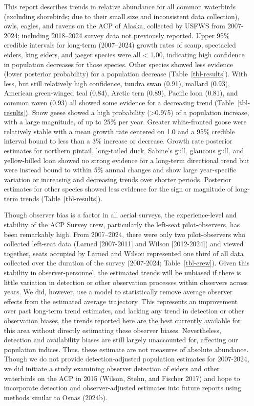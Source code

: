 \documentclass[
]{article}
\begin{document}
This report describes trends in relative abundance for all common
waterbirds (excluding shorebirds; due to their small size and
inconsistent data collection), owls, eagles, and ravens on the ACP of
Alaska, collected by USFWS from 2007-2024; including 2018--2024 survey
data not previously reported. Upper 95\% credible intervals for
long-term (2007--2024) growth rates of scaup, spectacled eiders, king
eiders, and jaeger species were all \textless{} 1.00, indicating high
confidence in population decreases for those species. Other species
showed less evidence (lower posterior probability) for a population
decrease (Table~\ref{tbl-results}). With less, but still relatively high
confidence, tundra swan (0.91), mallard (0.93), American green-winged
teal (0.84), Arctic tern (0.89), Pacific loon (0.81), and common raven
(0.93) all showed some evidence for a decreasing trend
(Table~\ref{tbl-results}). Snow geese showed a high probability
(\textgreater0.975) of a population increase, with a large magnitude, of
up to 25\% per year. Greater white-fronted goose were relatively stable
with a mean growth rate centered on 1.0 and a 95\% credible interval
bound to less than a 3\% increase or decrease. Growth rate posterior
estimates for northern pintail, long-tailed duck, Sabine's gull,
glaucous gull, and yellow-billed loon showed no strong evidence for a
long-term directional trend but were instead bound to within 5\% annual
changes and show large year-specific variation or increasing and
decreasing trends over shorter periods. Posterior estimates for other
species showed less evidence for the sign or magnitude of long-term
trends (Table~\ref{tbl-results}).

Though observer bias is a factor in all aerial surveys, the
experience-level and stability of the ACP Survey crew, particularly the
left-seat pilot-observers, has been remarkably high. From 2007--2024,
there were only two pilot-observers who collected left-seat data (Larned
{[}2007-2011{]} and Wilson {[}2012-2024{]}) and viewed together, seats
occupied by Larned and Wilson represented one third of all data
collected over the duration of the survey (2007-2024;
Table~\ref{tbl-crew}). Given this stability in observer-personnel, the
estimated trends will be unbiased if there is little variation in
detection or other observation processes within observers across years.
We did, however, use a model to statistically remove average observer
effects from the estimated average trajectory. This represents an
improvement over past long-term trend estimates, and lacking any trend
in detection or other observation biases, the trends reported here are
the best currently available for this area without directly estimating
these observer biases. Nevertheless, detection and availability biases
are still largely unaccounted for, affecting our population indices.
Thus, these estimate are not measures of absolute abundance. Though we
do not provide detection-adjusted population estimates for 2007-2024, we
did initiate a study examining observer detection of eiders and other
waterbirds on the ACP in 2015 (Wilson, Stehn, and Fischer 2017) and hope
to incorporate detection and observer-adjusted estimates into future
reports using methods similar to Osnas (2024b).
\end{document}
